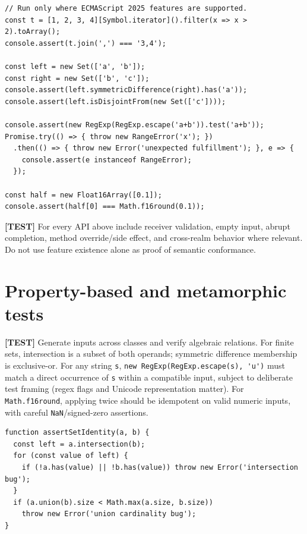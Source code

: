 \documentclass[11pt,letterpaper]{article}
\newcommand{\passthrough}[1]{#1}
\begin{document}
\begin{lstlisting}
// Run only where ECMAScript 2025 features are supported.
const t = [1, 2, 3, 4][Symbol.iterator]().filter(x => x > 2).toArray();
console.assert(t.join(',') === '3,4');

const left = new Set(['a', 'b']);
const right = new Set(['b', 'c']);
console.assert(left.symmetricDifference(right).has('a'));
console.assert(left.isDisjointFrom(new Set(['c'])));

console.assert(new RegExp(RegExp.escape('a+b')).test('a+b'));
Promise.try(() => { throw new RangeError('x'); })
  .then(() => { throw new Error('unexpected fulfillment'); }, e => {
    console.assert(e instanceof RangeError);
  });

const half = new Float16Array([0.1]);
console.assert(half[0] === Math.f16round(0.1));
\end{lstlisting}

\textbf{{[}TEST{]}} For every API above include receiver validation, empty input, abrupt completion, method override/side effect, and cross-realm behavior where relevant. Do not use feature existence alone as proof of semantic conformance.

\section{Property-based and metamorphic tests}\label{property-based-and-metamorphic-tests}

\textbf{{[}TEST{]}} Generate inputs across classes and verify algebraic relations. For finite sets, intersection is a subset of both operands; symmetric difference membership is exclusive-or. For any string \passthrough{\lstinline!s!}, \passthrough{\lstinline!new RegExp(RegExp.escape(s), 'u')!} must match a direct occurrence of \passthrough{\lstinline!s!} within a compatible input, subject to deliberate test framing (regex flags and Unicode representation matter). For \passthrough{\lstinline!Math.f16round!}, applying twice should be idempotent on valid numeric inputs, with careful \passthrough{\lstinline!NaN!}/signed-zero assertions.

\begin{lstlisting}
function assertSetIdentity(a, b) {
  const left = a.intersection(b);
  for (const value of left) {
    if (!a.has(value) || !b.has(value)) throw new Error('intersection bug');
  }
  if (a.union(b).size < Math.max(a.size, b.size))
    throw new Error('union cardinality bug');
}
\end{lstlisting}
\end{document}
